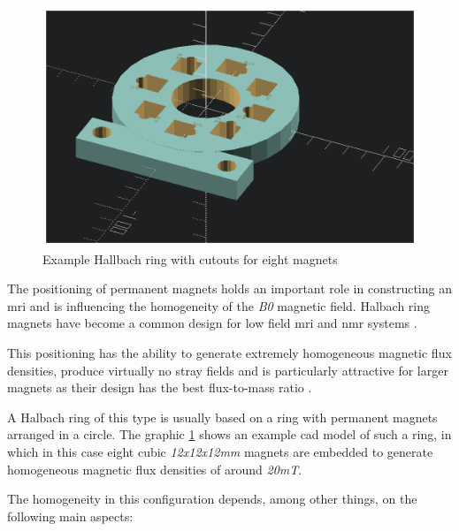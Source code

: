 \begin{figure}
\centering
\includegraphics{./generated_images/border_Example_Hallbach_ring_with_cutouts_for_eight_magnets.png}
\caption{Example Hallbach ring with cutouts for eight magnets
\label{Example_Hallbach_ring_with_cutouts_for_eight_magnets.png}}
\end{figure}

The positioning of permanent magnets holds an important role in
constructing an \gls{mri} and is influencing the homogeneity of the
\emph{B0} magnetic field. Halbach ring magnets
\cite{Halbach1980DesignOP} have become a common design for low field
\gls{mri} and \gls{nmr} systems \cite{cmr.a.20165}.

This positioning has the ability to generate extremely homogeneous
magnetic flux densities, produce virtually no stray fields and is
particularly attractive for larger magnets as their design has the best
flux-to-mass ratio \cite{Wickenbrock_2021}.

A Halbach ring of this type is usually based on a ring with permanent
magnets arranged in a circle. The graphic
\ref{Example_Hallbach_ring_with_cutouts_for_eight_magnets.png} shows an
example \gls{cad} model of such a ring, in which in this case eight
cubic \emph{12x12x12mm} magnets are embedded to generate homogeneous
magnetic flux densities of around \emph{20mT}.

The homogeneity in this configuration depends, among other things, on
the following main aspects:

